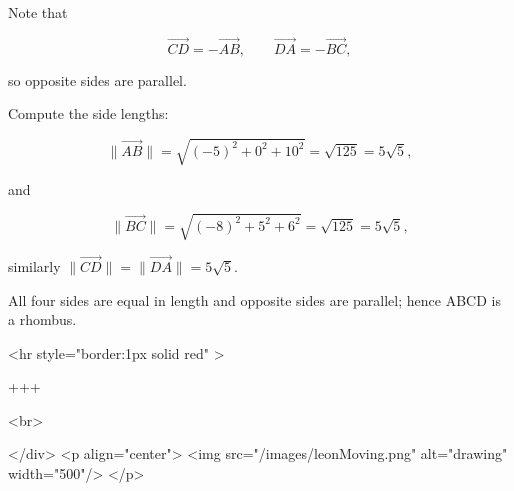 Note that

$$
\overrightarrow{CD}=-\overrightarrow{AB},\qquad \overrightarrow{DA}=-\overrightarrow{BC},
$$

so opposite sides are parallel.

Compute the side lengths:

$$
\lVert\overrightarrow{AB}\rVert=\sqrt{(-5)^2+0^2+10^2}=\sqrt{125}=5\sqrt{5},
$$

and

$$
\lVert\overrightarrow{BC}\rVert=\sqrt{(-8)^2+5^2+6^2}=\sqrt{125}=5\sqrt{5},
$$

similarly $\lVert\overrightarrow{CD}\rVert=\lVert\overrightarrow{DA}\rVert=5\sqrt{5}$.

All four sides are equal in length and opposite sides are parallel; hence ABCD is a rhombus.

<hr style="border:1px solid red" >

+++

<br>

</div>
<p align="center">
<img src="/images/leonMoving.png" alt="drawing" width="500"/>
</p>
